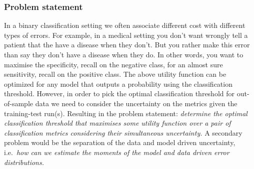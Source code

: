\documentclass[paper=a4, fontsize=12pt]{scrartcl}
\numberwithin{equation}{section} %
\numberwithin{figure}{section} %
\numberwithin{table}{section} %
\begin{document}
\subsubsection*{Problem statement}
In a binary classification setting we often associate different cost with different types of errors. For example, in a medical setting you don't want wrongly tell a patient that the have a disease when they don't. But you rather make this error than say they don't have a disease when they do.
In other words, you want to maximise the specificity, recall on the negative class, for an almost sure sensitivity, recall on the positive class. 
The above utility function can be optimized for any model that outputs a probability using the classification threshold.
However, in order to pick the optimal classification threshold for out-of-sample data we need to consider the uncertainty on the metrics given the training-test run(s).
Resulting in the problem statement: \textit{determine the optimal classification threshold that maximises some utility function over a pair of classification metrics considering their simultaneous uncertainty.}
A secondary problem would be the separation of the data and model driven uncertainty, i.e.\ \textit{how can we estimate the moments of the model and data driven error distributions.}
\end{document}

